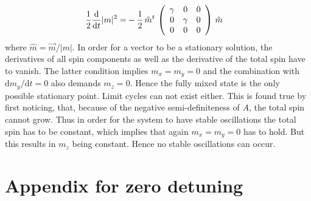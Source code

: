     \begin{align*}
        \frac{1}{2}\frac{\text{d}}{\text{d}t} |m|^2=&-\frac{1}{2}\,\hat{m}^t\,\left( \begin{array}{ccc}
            \gamma & 0&0  \\
            0& \gamma & 0\\
            0&0&0
       \end{array}\right)\,\hat{m}
    \end{align*}
    where $\hat{m}=\vec{m}/|m|$. In order for a vector to be a stationary solution, the derivatives of all spin components as well as the derivative of the total spin have to vanish. The latter condition implies $m_x=m_y=0$ and the combination with $\text{d}m_y/\text{d}t=0$ also demands $m_z=0$. Hence the fully mixed state is the only possible stationary point. Limit cycles can not exist either. This is found true by first noticing, that, because of the negative semi-definiteness of $A$, the total spin cannot grow. Thus in order for the system to have stable oscillations the total spin has to be constant, which implies that again $m_x=m_y=0$ has to hold. But this results in $m_z$ being constant. Hence no stable oscillations can occur.
   
    \chapter{Appendix for zero detuning}
